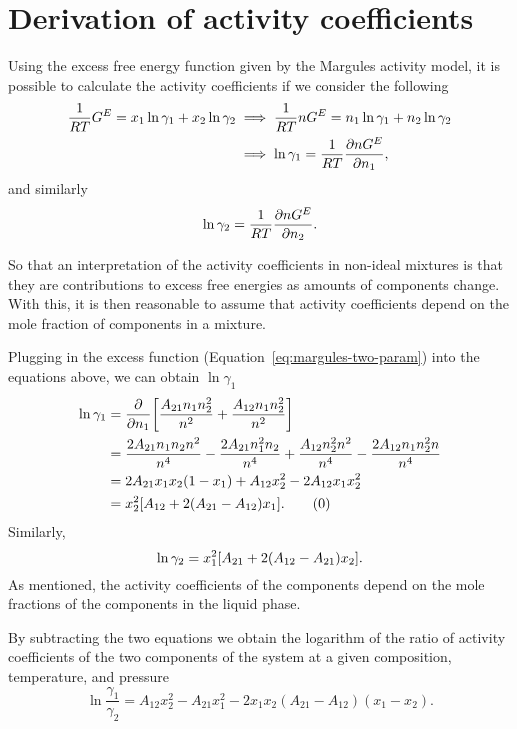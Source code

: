 \section{Derivation of activity coefficients}

Using the excess free energy function given by the Margules activity model, 
it is possible to calculate the activity coefficients if we consider the 
following
\begin{align*}
    \frac1{RT} G^E = x_1\ln\gamma_1 + x_2\ln\gamma_2 &\implies
    \frac1{RT}n G^E = n_1\ln\gamma_1 + n_2\ln\gamma_2 \\ &\implies
    \ln\gamma_1 = \frac1{RT} \pdv{nG^E}{n_1},
\end{align*}
and similarly
\[
    \ln\gamma_2 = \frac1{RT} \pdv{nG^E}{n_2}.
\]

So that an interpretation of the activity coefficients in non-ideal mixtures is
that they are contributions to excess free energies as amounts of components change.
With this, it is then reasonable to assume that activity coefficients depend on
the mole fraction of components in a mixture.

Plugging in the excess function (Equation~\ref{eq:margules-two-param}) into the
equations above, we can obtain $\ln\gamma_1$
\begin{align*}\label{eq:margules-act-1}
    \ln\gamma_1 &= \pdv{n_1} \qty[\dfrac{A_{21}n_1n_2^2}{n^2} + 
    \dfrac{A_{12}n_1n_2^2}{n^2}] \\
    &= \dfrac{2A_{21}n_1n_2n^2}{n^4} - \dfrac{2A_{21}n_1^2n_2}{n^4} +
    \dfrac{A_{12}n_2^2n^2}{n^4} - \dfrac{2A_{12}n_1n_2^2n}{n^4} \\
    &= 2A_{21}x_1x_2(1-x_1) + A_{12}x_2^2 - 2A_{12}x_1x_2^2 \\
    &= x_2^2 \qty[A_{12} + 2(A_{21} - A_{12})x_1]. \tag{\theequation}
\end{align*}
Similarly,
\begin{equation}\label{eq:margules-act-2}
    \ln\gamma_2 = x_1^2 \qty[A_{21} + 2(A_{12} - A_{21})x_2].
\end{equation}
As mentioned, the activity coefficients of the components depend on the mole 
fractions of the components in the liquid phase.

By subtracting the two equations we obtain the logarithm of the ratio of activity
coefficients of the two components of the system at a given composition, temperature,
and pressure
\begin{equation}\label{eq:act-diff}
    \ln\dfrac{\gamma_1}{\gamma_2} = A_{12}x_2^2 - A_{21}x_1^2 - 2x_1x_2
    (A_{21} - A_{12})(x_1 - x_2).
\end{equation}


